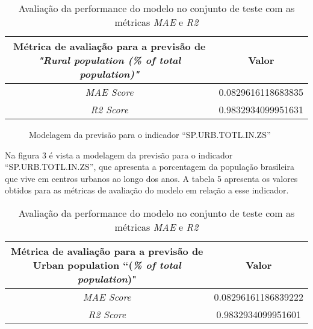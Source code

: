 \begin{table}[h]
    \centering
    \begin{tabular}{|c|c|}
        \hline
        \multicolumn{1}{|p{5cm}|}{Métrica de avaliação para a previsão de \emph{"Rural population (\% of total population)"}} & Valor \\
        \hline
        \emph{MAE Score} & 0.0829616118683835 \\
        \hline
        \emph{R2 Score} & 0.9832934099951631 \\
        \hline 
    \end{tabular}
    \caption{Avaliação da performance do modelo no conjunto de teste com as métricas \emph{MAE} e \emph{R2}}
\end{table}

\begin{figure}[h]
    \caption{Modelagem da previsão para o indicador “SP.URB.TOTL.IN.ZS”}
\end{figure}

Na figura 3 é vista a modelagem da previsão para o indicador “SP.URB.TOTL.IN.ZS”, que apresenta a porcentagem da 
população brasileira que vive em centros urbanos ao longo dos anos. A tabela 5 apresenta os valores obtidos 
para as métricas de avaliação do modelo em relação a esse indicador.

\begin{table}[h!]
    \centering
    \begin{tabular}{|c|c|}
        \hline
        \multicolumn{1}{|p{5cm}|}{Métrica de avaliação para a previsão de Urban population ``(\emph{\% of total population})"} & Valor \\
        \hline
        \emph{MAE Score} & 0.08296161186839222 \\
        \hline 
        \emph{R2 Score} & 0.9832934099951601 \\
        \hline
    \end{tabular}
    \caption{Avaliação da performance do modelo no conjunto de teste com as métricas \emph{MAE} e \emph{R2}}    
\end{table}